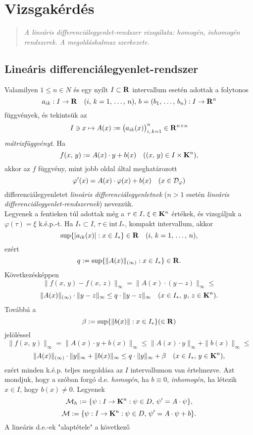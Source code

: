 \newpage
\section{Vizsgakérdés}
\begin{quote}
	\textit{A lineáris differenciálegyenlet-rendszer vizsgálata: homogén, inhomogén rendszerek. A megoldáshalmaz szerkezete.}
\end{quote}

\subsection{Lineáris differenciálegyenlet-rendszer}
Valamilyen $1 \leq n \in N$ és egy nyílt $I \subset \mathbf{R}$ intervallum esetén adottak a folytonos
\[
a_{ik} : I \to \mathbf{R} \quad (i, \, k = 1, \, \dots, \, n), \, b = (b_1, \, \dots, \, b_n) : I \to \mathbf{R}^n
\]
függvények, és tekintsük az
\[
I \ni x \mapsto A(x) := \big( a_{ik}(x) \big)_{i, \, k =1}^n \in \mathbf{R}^{n \times n}
\]
\textit{mátrixfüggvényt}. Ha
\[
f(x, \, y) := A(x) \cdot y + b(x) \quad ((x, \, y) \in I \times \mathbf{K}^n),
\]
akkor az $f$ függvény, mint jobb oldal által meghatározott
\[
\varphi'(x) = A(x) \cdot \varphi(x) + b(x) \quad (x \in \mathcal{D}_\varphi)
\]
differenciálegyenletet \textit{lineáris differenciálegyenletnek} ($n > 1$ esetén \textit{lineáris} \textit{differenciálegyenlet-rendszernek}) nevezzük.\\

Legyenek a fentieken túl adottak még a $\tau \in I, \, \xi \in \mathbf{K}^n$ értékek, és vizsgáljuk a $\varphi(\tau) = \xi$ k.é.p.-t. Ha $I_* \subset I$, $\tau \in \text{int} \, I_*$, kompakt intervallum, akkor
\[
\sup \{ |a_{ik}(x)| : x \in I_* \} \in \mathbf{R} \quad (i, \, k = 1, \, \dots, \, n),
\]
ezért
\[
q := \sup \{ \|A(x)\|_{(\infty)} : x \in I_* \} \in \mathbf{R}.
\]
Következésképpen
\[
\| f(x, \, y) - f(x, \, z) \|_\infty = \| A(x) \cdot (y- z) \|_\infty \leq
\]
\[
\|A(x)\|_{(\infty)} \cdot \|y-z\|_\infty \leq q \cdot \|y-z\|_\infty \quad (x \in I_*, \, y, \, z \in \mathbf{K}^n).
\]
Továbbá a
\[
\beta := \sup\{\|b(x)\| : x \in I_*\} (\in \mathbf{R})
\]
jelöléssel
\[
\|f(x, \, y)\|_\infty = \| A(x) \cdot y + b(x) \|_\infty \leq \|A(x) \cdot y\|_\infty + \|b(x)\|_\infty \leq
\]
\[
\|A(x)\|_{(\infty)} \cdot \|y\|_\infty + \|b(x)\|_\infty \leq q \cdot \|y\|_\infty + \beta \quad (x \in I_*, \, y \in \mathbf{K}^n),
\]
ezért minden k.é.p. teljes megoldása az $I$ intervallumon van értelmezve. Azt mondjuk, hogy a szóban forgó d.e. \textit{homogén}, ha $b \equiv 0$, \textit{inhomogén}, ha létezik $x \in I$, hogy $b(x) \neq 0$. Legyenek
\[
\mathcal{M}_h := \{ \psi : I \to \mathbf{K}^n : \psi \in D, \, \psi' = A \cdot \psi \},
\]
\[
\mathcal{M} := \{ \psi : I \to \mathbf{K}^n : \psi \in D, \, \psi' = A \cdot \psi + b\}.
\]
A lineáris d.e.-ek "alaptétele" a következő\\

